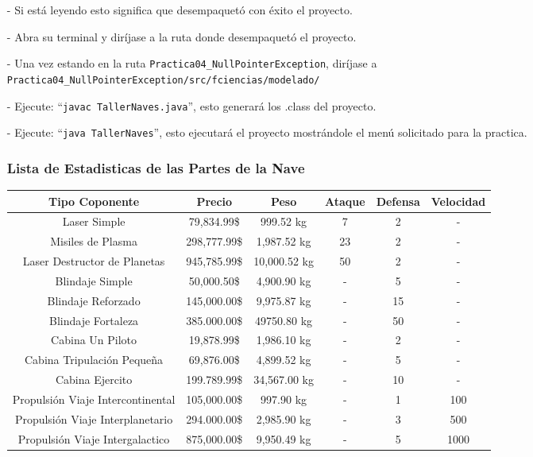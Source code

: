 \documentclass{article}
\newcommand{\code}[1]{\textcolor{white!25!black}{\texttt{#1}}}
\begin{document}
\begin{itemize}
\item[-] Si está leyendo esto significa que desempaquetó con éxito el proyecto.
\item[-] Abra su terminal y diríjase a la ruta donde desempaquetó el proyecto.
\item[-] Una vez estando en la ruta \code{Practica04\_NullPointerException}, diríjase a
  \code{Practica04\_NullPointerException/src/fciencias/modelado/}
\item[-] Ejecute: “\code{javac TallerNaves.java}”, esto generará los .class del proyecto.
\item[-] Ejecute: “\code{java TallerNaves}”, esto ejecutará el proyecto mostrándole el menú solicitado para la practica.
\subsubsection{Lista de Estadisticas de las Partes de la Nave}
\begin{table}[]
	\centering
	\begin{tabular}{|c|c|c|c|c|c|}
		\hline
		Tipo Coponente & Precio & Peso & Ataque & Defensa & Velocidad \\ \hline
		Laser Simple & 79,834.99\$ & 999.52 kg & 7 & 2 & - \\
		Misiles de Plasma & 298,777.99\$ & 1,987.52 kg & 23 & 2 & - \\
		Laser Destructor de Planetas & 945,785.99\$ & 10,000.52 kg & 50 & 2 & - \\
		Blindaje Simple & 50,000.50\$ & 4,900.90 kg & - & 5 & - \\
		Blindaje Reforzado & 145,000.00\$ & 9,975.87 kg & - & 15 & - \\
		Blindaje Fortaleza & 385.000.00\$ & 49750.80 kg & - & 50 & - \\
		Cabina Un Piloto & 19,878.99\$ & 1,986.10 kg & - & 2 & - \\
		Cabina Tripulación Pequeña & 69,876.00\$ & 4,899.52 kg & - & 5 & - \\
		Cabina Ejercito & 199.789.99\$ & 34,567.00 kg & - & 10 & - \\
		Propulsión Viaje Intercontinental & 105,000.00\$ & 997.90 kg & - & 1 & 100 \\
		Propulsión Viaje Interplanetario & 294.000.00\$ & 2,985.90 kg & - & 3 & 500 \\
		Propulsión Viaje Intergalactico & 875,000.00\$ & 9,950.49 kg & - & 5 & 1000 \\ \hline
	\end{tabular}
\end{table}
\end{itemize}
\end{document}
